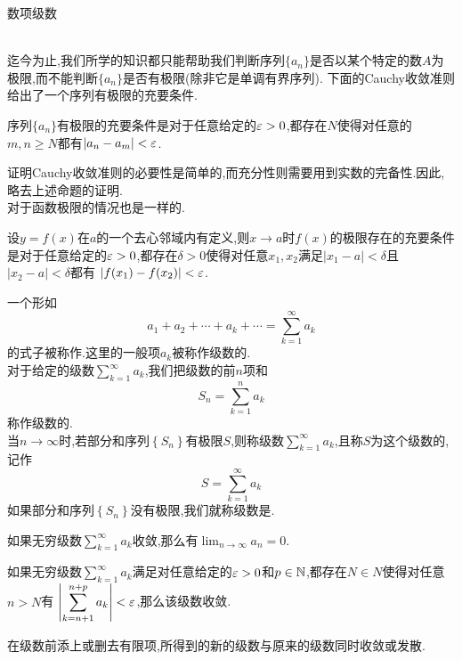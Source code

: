 \documentclass{ctexart}
\begin{document}
\pagestyle{empty}
\begin{center}\large 数项级数\end{center}
\\
迄今为止,我们所学的知识都只能帮助我们判断序列$\{a_n\}$是否以某个特定的数$A$为极限,而不能判断$\{a_n\}$是否有极限(除非它是单调有界序列).%
下面的Cauchy收敛准则给出了一个序列有极限的充要条件.
\begin{formal}[1.1 Cauchy收敛准则]
    序列$\{a_n\}$有极限的充要条件是对于任意给定的$\varepsilon>0$,都存在$N$使得对任意的$m,n\geqslant N$都有$\left|a_n-a_m\right|<\varepsilon$.
\end{formal}\noindent
证明Cauchy收敛准则的必要性是简单的,而充分性则需要用到实数的完备性.因此,略去上述命题的证明.\\
对于函数极限的情况也是一样的.
\begin{formal}[1.2 Cauchy收敛准则]
    设$y=f(x)$在$a$的一个去心邻域内有定义,则$x\to a$时$f(x)$的极限存在的充要条件是对于任意给定的$\varepsilon>0$,都存在$\delta>0$使得对任意$x_1,x_2$满足$\left|x_1-a\right|<\delta$且$\left|x_2-a\right|<\delta$都有%
    $\left|f(x_1)-f(x_2)\right|<\varepsilon$.
\end{formal}
\noindent{}
\begin{definition}[2.1 定义:无穷级数及其敛散性]
    一个形如
    \[a_1+a_2+\cdots+a_k+\cdots=\sum_{k=1}^{\infty}a_k\]
    的式子被称作.这里的一般项$a_k$被称作级数的.\\
    对于给定的级数$\displaystyle\sum_{k=1}^{\infty}a_k$,我们把级数的前$n$项和
    \[S_n=\sum_{k=1}^{n}a_k\]
    称作级数的.\\
    当$n\to\infty$时,若部分和序列$\left\{S_n\right\}$有极限$S$,则称级数$\displaystyle\sum_{k=1}^\infty a_k$,且称$S$为这个级数的,记作
    \[S=\sum_{k=1}^\infty a_k\]
    如果部分和序列$\left\{S_n\right\}$没有极限,我们就称级数是.
\end{definition}
\begin{formal}[2.2 无穷级数收敛则通项趋于$0$]
    如果无穷级数$\displaystyle\sum_{k=1}^\infty a_k$收敛,那么有$\displaystyle\lim_{n\to\infty}a_n=0$.
\end{formal}
\begin{formal}
    如果无穷级数$\displaystyle\sum_{k=1}^\infty a_k$满足对任意给定的$\varepsilon>0$和$p\in\mathbb{N}$,都存在$N\in N$使得对任意$n>N$有%
    \(\displaystyle\left|\sum_{k=n+1}^{n+p}a_k\right|<\varepsilon\),那么该级数收敛.
\end{formal}
\begin{formal}[2.4 修改级数的有限项不改变其敛散性]
    在级数前添上或删去有限项,所得到的新的级数与原来的级数同时收敛或发散.
\end{formal}
\end{document}
